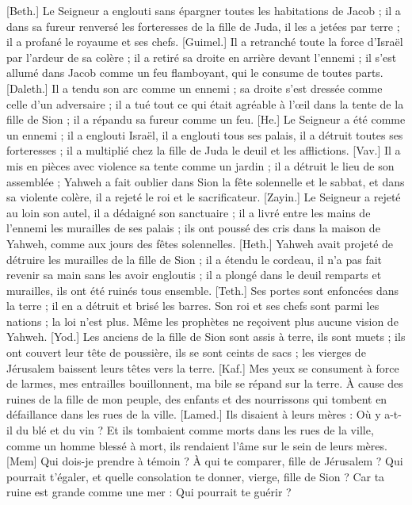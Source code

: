 \begin{multicols}{2}
[Beth.] Le Seigneur a englouti sans épargner toutes les habitations de Jacob ; il a dans sa fureur renversé les forteresses de la fille de Juda, il les a jetées par terre ; il a profané le royaume et ses chefs.
[Guimel.] Il a retranché toute la force d’Israël par l’ardeur de sa colère ; il a retiré sa droite en arrière devant l’ennemi ; il s’est allumé dans Jacob comme un feu flamboyant, qui le consume de toutes parts.
[Daleth.] Il a tendu son arc comme un ennemi ; sa droite s'est dressée comme celle d’un adversaire ; il a tué tout ce qui était agréable à l’œil dans la tente de la fille de Sion ; il a répandu sa fureur comme un feu.
[He.] Le Seigneur a été comme un ennemi ; il a englouti Israël, il a englouti tous ses palais, il a détruit toutes ses forteresses ; il a multiplié chez la fille de Juda le deuil et les afflictions.
[Vav.] Il a mis en pièces avec violence sa tente comme un jardin ; il a détruit le lieu de son assemblée ; Yahweh a fait oublier dans Sion la fête solennelle et le sabbat, et dans sa violente colère, il a rejeté le roi et le sacrificateur.
[Zayin.] Le Seigneur a rejeté au loin son autel, il a dédaigné son sanctuaire ; il a livré entre les mains de l’ennemi les murailles de ses palais ; ils ont poussé des cris dans la maison de Yahweh, comme aux jours des fêtes solennelles.
[Heth.] Yahweh avait projeté de détruire les murailles de la fille de Sion ; il a étendu le cordeau, il n’a pas fait revenir sa main sans les avoir engloutis ; il a plongé dans le deuil remparts et murailles, ils ont été ruinés tous ensemble.
[Teth.] Ses portes sont enfoncées dans la terre ; il en a détruit et brisé les barres. Son roi et ses chefs sont parmi les nations ; la loi n’est plus. Même les prophètes ne reçoivent plus aucune vision de Yahweh.
[Yod.] Les anciens de la fille de Sion sont assis à terre, ils sont muets ; ils ont couvert leur tête de poussière, ils se sont ceints de sacs ; les vierges de Jérusalem baissent leurs têtes vers la terre.
[Kaf.] Mes yeux se consument à force de larmes, mes entrailles bouillonnent, ma bile se répand sur la terre. À cause des ruines de la fille de mon peuple, des enfants et des nourrissons qui tombent en défaillance dans les rues de la ville.
[Lamed.] Ils disaient à leurs mères : Où y a-t-il du blé et du vin ? Et ils tombaient comme morts dans les rues de la ville, comme un homme blessé à mort, ils rendaient l'âme sur le sein de leurs mères.
[Mem] Qui dois-je prendre à témoin ? À qui te comparer, fille de Jérusalem ? Qui pourrait t'égaler, et quelle consolation te donner, vierge, fille de Sion ? Car ta ruine est grande comme une mer : Qui pourrait te guérir ?

\end{multicols}
